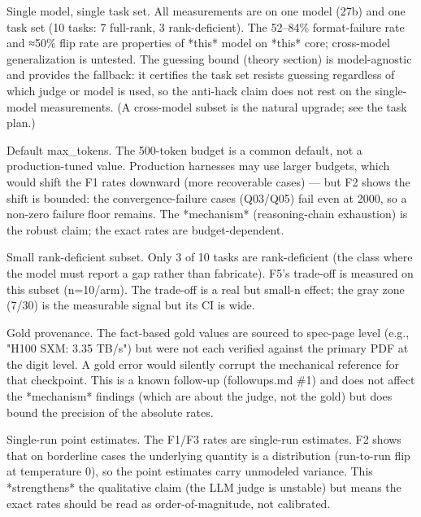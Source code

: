\documentclass[10pt,twocolumn]{article}
\begin{document}
Single model, single task set. All measurements are on one model (27b) and one task set (10 tasks: 7 full-rank, 3 rank-deficient). The 52–84\% format-failure rate and ≈50\% flip rate are properties of *this* model on *this* core; cross-model generalization is untested. The guessing bound (theory section) is model-agnostic and provides the fallback: it certifies the task set resists guessing regardless of which judge or model is used, so the anti-hack claim does not rest on the single-model measurements. (A cross-model subset is the natural upgrade; see the task plan.)


Default max\_tokens. The 500-token budget is a common default, not a production-tuned value. Production harnesses may use larger budgets, which would shift the F1 rates downward (more recoverable cases) — but F2 shows the shift is bounded: the convergence-failure cases (Q03/Q05) fail even at 2000, so a non-zero failure floor remains. The *mechanism* (reasoning-chain exhaustion) is the robust claim; the exact rates are budget-dependent.


Small rank-deficient subset. Only 3 of 10 tasks are rank-deficient (the class where the model must report a gap rather than fabricate). F5's trade-off is measured on this subset (n=10/arm). The trade-off is a real but small-n effect; the gray zone (7/30) is the measurable signal but its CI is wide.


Gold provenance. The fact-based gold values are sourced to spec-page level (e.g., "H100 SXM: 3.35 TB/s") but were not each verified against the primary PDF at the digit level. A gold error would silently corrupt the mechanical reference for that checkpoint. This is a known follow-up (followups.md \#1) and does not affect the *mechanism* findings (which are about the judge, not the gold) but does bound the precision of the absolute rates.


Single-run point estimates. The F1/F3 rates are single-run estimates. F2 shows that on borderline cases the underlying quantity is a distribution (run-to-run flip at temperature 0), so the point estimates carry unmodeled variance. This *strengthens* the qualitative claim (the LLM judge is unstable) but means the exact rates should be read as order-of-magnitude, not calibrated.
\end{document}
